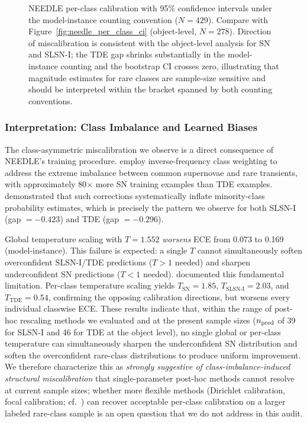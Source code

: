 \documentclass[twocolumn]{aastex631}
\begin{document}
\begin{figure}[t]
\caption{NEEDLE per-class calibration with 95\% confidence intervals
under the model-instance counting convention ($N = 429$). Compare with
Figure~\ref{fig:needle_per_class_ci} (object-level, $N = 278$).
Direction of miscalibration is consistent with the object-level
analysis for SN and SLSN-I; the TDE gap shrinks substantially in the
model-instance counting and the bootstrap CI crosses zero, illustrating
that magnitude estimates for rare classes are sample-size sensitive
and should be interpreted within the bracket spanned by both
counting conventions. \label{fig:needle_per_class_ci_mi}}
\end{figure}

\subsubsection{Interpretation: Class Imbalance and Learned Biases} \label{sec:needle_interp}

The class-asymmetric miscalibration we observe is a direct consequence of NEEDLE's training procedure. \citet{sheng2024} employ inverse-frequency class weighting to address the extreme imbalance between common supernovae and rare transients, with approximately 80$\times$ more SN training examples than TDE examples. \citet{vandengoorbergh2022} demonstrated that such corrections systematically inflate minority-class probability estimates, which is precisely the pattern we observe for both SLSN-I (gap $= -0.423$) and TDE (gap $= -0.296$).

Global temperature scaling with $T = 1.552$ \emph{worsens} ECE from 0.073 to 0.169 (model-instance). This failure is expected: a single $T$ cannot simultaneously soften overconfident SLSN-I/TDE predictions ($T > 1$ needed) and sharpen underconfident SN predictions ($T < 1$ needed). \citet{kull2019} documented this fundamental limitation. Per-class temperature scaling yields $T_{\text{SN}} = 1.85$, $T_{\text{SLSN-I}} = 2.03$, and $T_{\text{TDE}} = 0.54$, confirming the opposing calibration directions, but worsens every individual classwise ECE. These results indicate that, within the range of post-hoc rescaling methods we evaluated and at the present sample sizes ($n_{\rm pred}$ of 39 for SLSN-I and 46 for TDE at the object level), no single global or per-class temperature can simultaneously sharpen the underconfident SN distribution and soften the overconfident rare-class distributions to produce uniform improvement. We therefore characterize this as \textit{strongly suggestive of class-imbalance-induced structural miscalibration} that single-parameter post-hoc methods cannot resolve at current sample sizes; whether more flexible methods (Dirichlet calibration, focal calibration; cf.\ \citealt{kull2019, mukhoti2020}) can recover acceptable per-class calibration on a larger labeled rare-class sample is an open question that we do not address in this audit.
\end{document}
